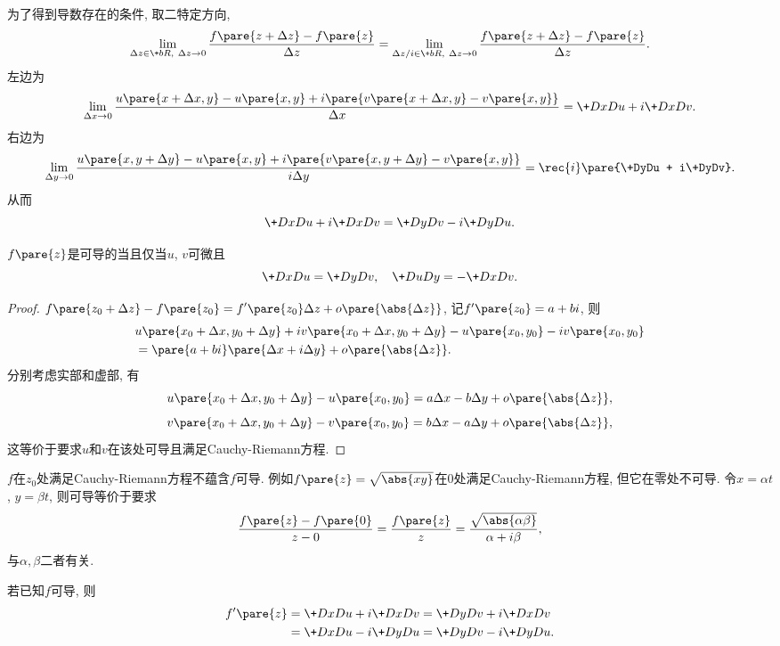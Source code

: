 \documentclass[../ComplexVariable.tex]{subfiles}
\begin{document}
为了得到导数存在的条件, 取二特定方向,
\[ \lim_{\Delta z \in \+bR,\ \Delta z\rightarrow 0} \frac{f\pare{z+\Delta z} - f\pare{z}}{\Delta z} = \lim_{\Delta z/i \in \+bR,\ \Delta z \rightarrow 0} \frac{f\pare{z+\Delta z} - f\pare{z}}{\Delta z}. \]
左边为
\[ \lim_{\Delta x\rightarrow 0} \frac{u\pare{x+\Delta x, y} - u\pare{x,y} + i\pare{v\pare{x+\Delta x, y} - v\pare{x,y}}}{\Delta x} = \+DxDu + i\+DxDv. \]
右边为
\[ \lim_{\Delta y\rightarrow 0} \frac{u\pare{x, y + \Delta y} - u\pare{x,y} + i\pare{v\pare{x, y + \Delta y} - v\pare{x,y}}}{i \Delta y} = \rec{i}\pare{\+DyDu + i\+DyDv}. \]
从而
\[ \+DxDu + i\+DxDv = \+DyDv - i\+DyDu. \]
\begin{finale}
    \begin{theorem}
        $f\pare{z}$是可导的当且仅当$u$, $v$可微且
        \[ \+DxDu = \+DyDv,\quad \+DuDy = -\+DxDv. \]
    \end{theorem}
\end{finale}
\begin{proof}
    $\displaystyle f\pare{z_0+\Delta z} - f\pare{z_0} = f'\pare{z_0}\Delta z + o\pare{\abs{\Delta z}}$, 记$f'\pare{z_0} = a+bi$, 则
    \begin{align*}
        &u\pare{x_0+\Delta x, y_0+\Delta y} + iv\pare{x_0+\Delta x, y_0+\Delta y} - u\pare{x_0, y_0} - iv\pare{x_0,y_0} \\&= \pare{a+bi}\pare{\Delta x + i\Delta y} + o\pare{\abs{\Delta z}}. 
    \end{align*}
    分别考虑实部和虚部, 有
    \[ u\pare{x_0+\Delta x, y_0+\Delta y} - u\pare{x_0, y_0} = a\Delta x - b\Delta y + o\pare{\abs{\Delta z}}, \]
    \[ v\pare{x_0+\Delta x, y_0+\Delta y} - v\pare{x_0, y_0} = b\Delta x - a\Delta y + o\pare{\abs{\Delta z}}, \]
    这等价于要求$u$和$v$在该处可导且满足Cauchy-Riemann方程.
\end{proof}
\begin{remark}
    $f$在$z_0$处满足Cauchy-Riemann方程不蕴含$f$可导. 例如$f\pare{z} = \sqrt{\abs{xy}}$在$0$处满足Cauchy-Riemann方程, 但它在零处不可导. 令$x=\alpha t$, $y = \beta t$, 则可导等价于要求
    \[ \frac{f\pare{z} - f\pare{0}}{z-0} = \frac{f\pare{z}}{z} = \frac{\sqrt{\abs{\alpha\beta}}}{\alpha+i\beta}, \]
    与$\alpha,\beta$二者有关.
\end{remark}
\begin{theorem}[导数的表达式]
    若已知$f$可导, 则
    \begin{align*}
        f'\pare{z} &= \+DxDu + i\+DxDv = \+DyDv + i\+DxDv \\
        &= \+DxDu - i\+DyDu = \+DyDv - i\+DyDu.
    \end{align*}
\end{theorem}
\end{document}

